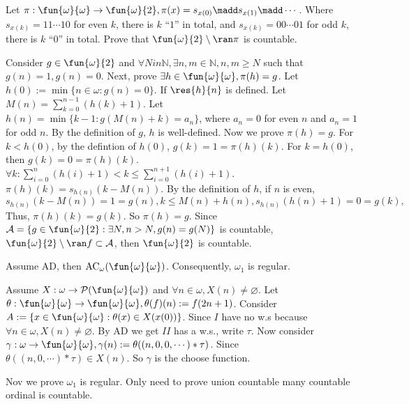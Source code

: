 \documentclass{ctexart}
\begin{document}
\begin{problem}
  Let \(\pi:\fun{\omega}{\omega} \to \fun{\omega}{2},\pi(x)=s_{x(0)}\madd s_{x(1)}\madd\cdots\). 
  Where \(s_{x(k)}=11\cdots10\) for even \(k\), there is \(k\) ``\(1\)'' in total, and \(s_{x(k)}=00\cdots0 1\) for odd \(k\), there is \(k\) ``\(0\)'' in total. 
  Prove that \(\fun{\omega}{2} \setminus \ran \pi\) is countable. 
\end{problem}

\begin{solution}
  Consider \(g \in \fun{\omega}{2}\) and \(\forall N in \mathbb{N}, \exists n,m \in \mathbb{N}, n,m \geq N\) such that 
  \(g(n) = 1, g(n) = 0\). 
  Next, prove \(\exists h \in \fun{ \omega}{\omega},\pi(h)=g\). 
  Let \(h(0):=\min\{n \in \omega:g(n)=0\}\). 
  If \(\res{h}{n}\) is defined. Let \(M(n)=\sum_{k=0}^{n-1} (h(k)+1) \). 
  Let \(h(n)= \min\{k- 1:g(M(n)+k)=a_n\}\), where \(a_n=0\) for even \(n\) and \(a_n=1\) for odd \(n\). 
  By the definition of \(g\), \(h\) is well-defined. Now we prove \(\pi(h)=g\). 
  For \(k<h(0)\), by the defintion of \(h(0)\), \(g(k)=1=\pi(h)(k)\). 
  For \(k=h(0)\), then \(g(k)=0=\pi(h)(k)\). 
  \(\forall k: \sum_{i=0}^{n} (h(i)+1) <k \leq \sum_{i=0}^{n+1} (h(i)+1)\). 
  \(\pi(h)(k)=s_{h(n)}(k-M(n) )\). By the definition of \(h\), if \(n\) is even, 
  \(s_{h(n)}(k-M(n))=1=g(n), k \leq M(n)+h(n), s_{h(n)}(h(n)+1)= 0 = g(k),\)
  Thus, \(\pi(h)(k) = g(k)\). So \(\pi(h)=g\).
  Since \(\mathcal{A} = \{g \in \fun{\omega}{2}: \exists N, n >N , g(n)=g(N)\}\) is countable,
  \(\fun{\omega}{2} \setminus \ran f \subset \mathcal{A}\), then \(\fun{\omega}{2}\) is countable.
\end{solution}

\begin{problem}
  Assume AD, then \(\mathrm{AC}_\omega(\fun{\omega}{\omega}) \). Consequently, \(\omega_1\) is regular. 
\end{problem}

\begin{solution}
  Assume \(X:\omega \to \mathcal{P}(\fun{\omega}{\omega})\) and \(\forall n \in \omega,X(n)\neq \varnothing\). 
  Let \(\theta:\fun{\omega}{\omega}\to \fun{\omega}{\omega},\theta(f)(n):=f(2n+1)\). 
  Consider \(A:=\{x \in \fun{\omega}{\omega}:\theta(x) \in X(x(0))\}\). 
  Since \(I\) have no w.s because \(\forall n \in \omega,X(n)\neq \varnothing\). 
  By AD we get \(II\) has a w.s., write \(\tau\). 
  Now consider \(\gamma:\omega \to \fun{\omega}{\omega},\gamma(n):=\theta((n,0,0,\cdots)*\tau)\). 
  Since \(\theta((n,0,\cdots)*\tau) \in X(n)\). So \(\gamma\) is the choose function. 
  
  Nov we prove \(\omega_1\) is regular. Only need to prove union countable many countable ordinal is countable. 
  
\end{solution}
\end{document}

